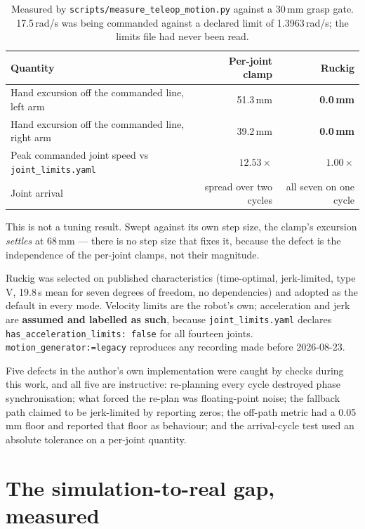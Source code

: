 \documentclass[11pt,a4paper,oneside]{report}
\newcommand{\code}[1]{\texttt{\small #1}}
\newcommand{\file}[1]{\texttt{\small #1}}
\begin{document}
\begin{table}[H]
\centering
\small
\begin{tabular}{@{}lrr@{}}
\toprule
\textbf{Quantity} & \textbf{Per-joint clamp} & \textbf{Ruckig} \\
\midrule
Hand excursion off the commanded line, left arm & 51.3\,mm & \textbf{0.0\,mm} \\
Hand excursion off the commanded line, right arm & 39.2\,mm & \textbf{0.0\,mm} \\
Peak commanded joint speed vs \file{joint\_limits.yaml} & $12.53\times$ & $1.00\times$ \\
Joint arrival & spread over two cycles & all seven on one cycle \\
\bottomrule
\end{tabular}
\caption{Measured by \file{scripts/measure\_teleop\_motion.py} against a 30\,mm
grasp gate. 17.5\,rad/s was being commanded against a declared limit of
1.3963\,rad/s; the limits file had never been read.}
\end{table}

This is not a tuning result. Swept against its own step size, the clamp's
excursion \emph{settles} at 68\,mm --- there is no step size that fixes it,
because the defect is the independence of the per-joint clamps, not their
magnitude.

Ruckig was selected on published characteristics (time-optimal, jerk-limited,
type V, 19.8\,\textmu s mean for seven degrees of freedom, no dependencies)
and adopted as the default in every mode. Velocity limits are the robot's own;
acceleration and jerk are \textbf{assumed and labelled as such}, because
\file{joint\_limits.yaml} declares \code{has\_acceleration\_limits: false} for
all fourteen joints. \code{motion\_generator:=legacy} reproduces any recording
made before 2026-08-23.

Five defects in the author's own implementation were caught by checks during
this work, and all five are instructive: re-planning every cycle destroyed
phase synchronisation; what forced the re-plan was floating-point noise; the
fallback path claimed to be jerk-limited by reporting zeros; the off-path
metric had a 0.05\,mm floor and reported that floor as behaviour; and the
arrival-cycle test used an absolute tolerance on a per-joint quantity.

\section{The simulation-to-real gap, measured}
\end{document}
